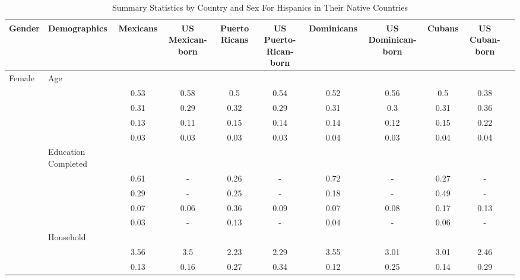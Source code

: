 \begin{table}[ht]
\centering
\caption{Summary Statistics by Country and Sex For Hispanics in Their Native Countries} 
\begingroup\small
\begin{tabular}{l>{\raggedright\arraybackslash}p{3.2cm}|ccccccccc}
  \hline
Gender & Demographics & Mexicans & US Mexican-born & Puerto Ricans & US Puerto-Rican-born & Dominicans & US Dominican-born & Cubans & US Cuban-born \\ 
  \hline
Female & Age &  &  &  &  &  &  &  &  \\ 
   & \multicolumn{1}{>{\raggedleft\arraybackslash}p{1.5cm}|}{\makebox[1.5cm][r]{60 - 69 }} & 0.53 & 0.58 & 0.5 & 0.54 & 0.52 & 0.56 & 0.5 & 0.38 \\ 
   & \multicolumn{1}{>{\raggedleft\arraybackslash}p{1.5cm}|}{\makebox[1.5cm][r]{70 - 79 }} & 0.31 & 0.29 & 0.32 & 0.29 & 0.31 & 0.3 & 0.31 & 0.36 \\ 
   & \multicolumn{1}{>{\raggedleft\arraybackslash}p{1.5cm}|}{\makebox[1.5cm][r]{80 - 89 }} & 0.13 & 0.11 & 0.15 & 0.14 & 0.14 & 0.12 & 0.15 & 0.22 \\ 
   & \multicolumn{1}{>{\raggedleft\arraybackslash}p{1.5cm}|}{\makebox[1.5cm][r]{90 plus }} & 0.03 & 0.03 & 0.03 & 0.03 & 0.04 & 0.03 & 0.04 & 0.04 \\ 
   & Education Completed &  &  &  &  &  &  &  &  \\ 
   & \multicolumn{1}{>{\raggedleft\arraybackslash}p{3.2cm}|}{\makebox[3.2cm][r]{Less than Primary }} & 0.61 & - & 0.26 & - & 0.72 & - & 0.27 & - \\ 
   & \multicolumn{1}{>{\raggedleft\arraybackslash}p{1.7cm}|}{\makebox[1.7cm][r]{Primary }} & 0.29 & - & 0.25 & - & 0.18 & - & 0.49 & - \\ 
   & \multicolumn{1}{>{\raggedleft\arraybackslash}p{2cm}|}{\makebox[2cm][r]{Secondary }} & 0.07 & 0.06 & 0.36 & 0.09 & 0.07 & 0.08 & 0.17 & 0.13 \\ 
   & \multicolumn{1}{>{\raggedleft\arraybackslash}p{2cm}|}{\makebox[2cm][r]{University }} & 0.03 & - & 0.13 & - & 0.04 & - & 0.06 & - \\ 
   & Household &  &  &  &  &  &  &  &  \\ 
   & \multicolumn{1}{>{\raggedleft\arraybackslash}p{2.7cm}|}{\makebox[2.7cm][r]{Household Size }} & 3.56 & 3.5 & 2.23 & 2.29 & 3.55 & 3.01 & 3.01 & 2.46 \\ 
   & \multicolumn{1}{>{\raggedleft\arraybackslash}p{2.2cm}|}{\makebox[2.2cm][r]{Lives Alone }} & 0.13 & 0.16 & 0.27 & 0.34 & 0.12 & 0.25 & 0.14 & 0.29 \\ 

\end{tabular}
\end{table}
